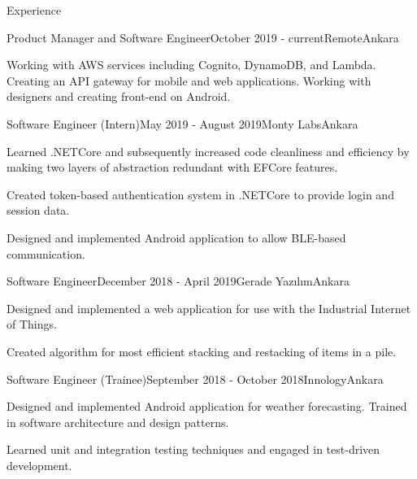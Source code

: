 \documentclass{resume} %
\begin{document}
\begin{rSection}{Experience}

    
    
    \begin{rSubsection}{Product Manager and Software Engineer}{October 2019 - current}{Remote}{Ankara}
        \item Working with AWS services including Cognito, DynamoDB, and Lambda. Creating an API gateway for mobile and web applications. Working with designers and creating front-end on Android.
    \end{rSubsection}
    
    \begin{rSubsection}{Software Engineer (Intern)}{May 2019 - August 2019}{Monty Labs}{Ankara}
        \item Learned .NETCore and subsequently increased code cleanliness and efficiency by making two layers of abstraction redundant with EFCore features.
        
        \item Created token-based authentication system in .NETCore to provide login and session data.
        
        \item Designed and implemented Android application to allow BLE-based communication.
    \end{rSubsection}
    
    \begin{rSubsection}{Software Engineer}{December 2018 - April 2019}{Gerade Yazılım}{Ankara}
        \item Designed and implemented a web application for use with the Industrial Internet of Things.
        \item Created algorithm for most efficient stacking and restacking of items in a pile.
    \end{rSubsection}
    
    \begin{rSubsection}{Software Engineer (Trainee)}{September 2018 - October 2018}{Innology}{Ankara}
        \item Designed and implemented Android application for weather forecasting. Trained in software architecture and design patterns.
    
        \item Learned unit and integration testing techniques and engaged in test-driven development.
    \end{rSubsection}
    
\end{rSection}
\end{document}
